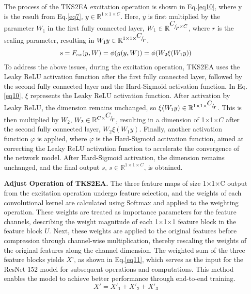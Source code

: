 \documentclass[sn-mathphys]{sn-jnl}%
\theoremstyle{thmstyleone}%
\theoremstyle{thmstyletwo}%
\theoremstyle{thmstylethree}%
\begin{document}
The process of the TKS2EA excitation operation is shown in Eq.\eqref{eq10}, where y is the result from Eq.\eqref{eq7}, $ y \in {\mathbb{R}^{1 \times 1 \times C}} $. Here, $ y $ is first multiplied by the parameter $ {W_1} $ in the first fully connected layer, $ {W_1} \in {\mathbb{R}^{{\raise0.7ex\hbox{$C$} \!\mathord{\left/
				{\vphantom {C r}}\right.\kern-\nulldelimiterspace}
			\!\lower0.7ex\hbox{$r$}} \times C}} $, where $ r $ is the scaling parameter, resulting in $ {W_1}y \in {\mathbb{R}^{1 \times 1 \times {\raise0.7ex\hbox{$C$} \!\mathord{\left/
				{\vphantom {C r}}\right.\kern-\nulldelimiterspace}
			\!\lower0.7ex\hbox{$r$}}}} $.  
\begin{equation}
	{\rm{s}} = {F_{ex}}(y,W) = \phi (g(y,W)) = \phi ({W_2}\xi ({W_1}y))
	\label{eq10}
\end{equation}
To address the above issues, during the excitation operation, TKS2EA uses the Leaky ReLU activation function after the first fully connected layer, followed by the second fully connected layer and the Hard-Sigmoid activation function.  
In Eq.\eqref{eq10}, $ \xi $ represents the Leaky ReLU activation function. After activation by Leaky ReLU, the dimension remains unchanged, so $ \xi ({W_1}y) \in {\mathbb{R}^{1 \times 1 \times {\raise0.7ex\hbox{$C$} \!\mathord{\left/
				{\vphantom {C r}}\right.\kern-\nulldelimiterspace}
			\!\lower0.7ex\hbox{$r$}}}} $. This is then multiplied by $ {W_2} $, $ {W_2} \in {\mathbb{R}^{C \times {\raise0.7ex\hbox{$C$} \!\mathord{\left/
				{\vphantom {C r}}\right.\kern-\nulldelimiterspace}
			\!\lower0.7ex\hbox{$r$}}}} $, resulting in a dimension of 1×1×$ C $ after the second fully connected layer, $ {W_2}\xi ({W_1}y) $. Finally, another activation function $ \varphi $ is applied, where $ \varphi $ is the Hard-Sigmoid activation function, aimed at correcting the Leaky ReLU activation function to accelerate the convergence of the network model. After Hard-Sigmoid activation, the dimension remains unchanged, and the final output $ s $, $s \in {\mathbb{R}^{1 \times 1 \times C}} $, is obtained.  

\textbf{Adjust Operation of TKS2EA. }The three feature maps of size 1×1×C output from the excitation operation undergo feature selection, and the weights of each convolutional kernel are calculated using Softmax and applied to the weighting operation. These weights are treated as importance parameters for the feature channels, describing the weight magnitude of each 1×1×1 feature block in the feature block $ U $. Next, these weights are applied to the original features before compression through channel-wise multiplication, thereby rescaling the weights of the original features along the channel dimension. The weighted sum of the three feature blocks yields $ X’ $, as shown in Eq.\eqref{eq11}, which serves as the input for the ResNet 152 model for subsequent operations and computations. This method enables the model to achieve better performance through end-to-end training.
\begin{equation}
	{X'} = {X'}_1 + {X'}_2 + {X'}_3
	\label{eq11}
\end{equation}
\end{document}
